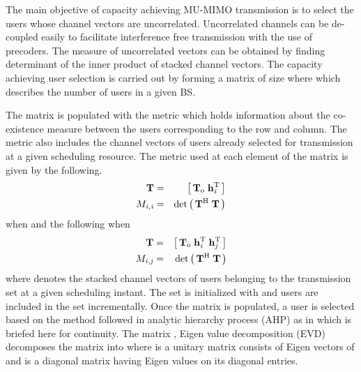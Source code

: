 
The main objective of capacity achieving MU-MIMO transmission is to select the users whose channel vectors are uncorrelated. Uncorrelated channels can be de-coupled easily to facilitate interference free transmission with the use of precoders. The measure of uncorrelated vectors can be obtained by finding determinant of the inner product of stacked  channel vectors. The capacity achieving user selection is carried out by forming a matrix  of size  where  which describes the number of users in a given BS.

The matrix  is populated with the metric which holds information about the co-existence measure between the users corresponding to the  row and  column. The metric also includes the channel vectors of users already selected for transmission at a given scheduling resource. The metric used at each element of the matrix  is given by the following.
\begin{eqnarray}
\mathbf{T} &=& \left [\,\mathbf{T}_{\mathrm{o}} \; \mathbf{h}_{\mathit{i}}^{\mathrm{T}} \, \right ] \\
{M}_{\mathit{i},\mathit{i}} &=& \det{\left ( \, \mathbf{T}^{\mathrm{H}} \; \mathbf{T} \, \right )} \label{mca1-e1:1}
\label{mca1-e1}
\end{eqnarray}
when  and the following when 
\begin{eqnarray}
\mathbf{T} &=& \left [\,\mathbf{T}_{\mathrm{o}} \; \mathbf{h}_{\mathit{i}}^{\mathrm{T}} \; \mathbf{h}_{\mathit{j}}^{\mathrm{T}} \, \right ] \\
{M}_{\mathit{i},\mathit{j}} &=& \det{\left ( \, \mathbf{T}^{\mathrm{H}} \; \mathbf{T} \, \right )} \label{mca1-e2:1}
\label{mca1-e2}
\end{eqnarray}
where  denotes the stacked channel vectors of users belonging to the transmission set  at a given scheduling instant. The set  is initialized with \me{\emptyset} and users are included in the set incrementally. Once the matrix  is populated, a user is selected based on the method followed in analytic hierarchy process (AHP) as in \cite{saaty2008decision} which is briefed here for continuity. The matrix , Eigen value decomposition (EVD) decomposes the matrix into  where  is a unitary matrix consists of Eigen vectors of  and  is a diagonal matrix having Eigen values on its diagonal entries.

